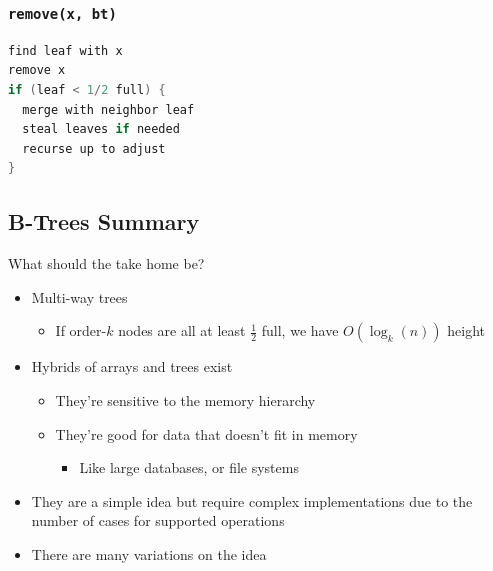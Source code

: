 \documentclass[
  10pt,
  english,
  letterpaper,
,tablecaptionabove
]{scrartcl}
\providecommand{\tightlist}{%
  \setlength{\itemsep}{0pt}\setlength{\parskip}{0pt}}
\begin{document}
\hypertarget{removex-bt}{%
\subsubsection{\texorpdfstring{\texttt{remove(x,\ bt)}}{remove(x, bt)}}\label{removex-bt}}

\begin{lstlisting}[language=Java]
find leaf with x
remove x
if (leaf < 1/2 full) {
  merge with neighbor leaf
  steal leaves if needed
  recurse up to adjust
}
\end{lstlisting}

\hypertarget{b-trees-summary}{%
\subsection{B-Trees Summary}\label{b-trees-summary}}

What should the take home be?

\begin{itemize}
\tightlist
\item
  Multi-way trees

  \begin{itemize}
  \tightlist
  \item
    If order-\(k\) nodes are all at least \(\frac{1}{2}\) full, we have
    \(O(\log_k(n))\) height
  \end{itemize}
\item
  Hybrids of arrays and trees exist

  \begin{itemize}
  \tightlist
  \item
    They're sensitive to the memory hierarchy
  \item
    They're good for data that doesn't fit in memory

    \begin{itemize}
    \tightlist
    \item
      Like large databases, or file systems
    \end{itemize}
  \end{itemize}
\item
  They are a simple idea but require complex implementations due to the
  number of cases for supported operations
\item
  There are many variations on the idea
\end{itemize}
\end{document}
